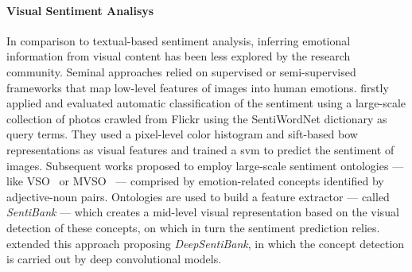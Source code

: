 \paragraph{Visual Sentiment Analisys}
In comparison to textual-based sentiment analysis, inferring emotional information from visual content has been less explored by the research community.
Seminal approaches \cite{machajdik2010affective,siersdorfer2010analyzing,jia2012can} relied on supervised or semi-supervised frameworks that map low-level features of images into human emotions.
\citet{siersdorfer2010analyzing} firstly applied and evaluated automatic classification of the sentiment using a large-scale collection of photos crawled from Flickr using the SentiWordNet \cite{esuli2007sentiwordnet} dictionary as query terms.
They used a pixel-level color histogram and \acrshort{sift}-based \acrlong{bow} representations as visual features and trained a \gls{svm} to predict the sentiment of images.
Subsequent works \cite{borth2013large,yuan2013sentribute,jou2015visual} proposed to employ large-scale sentiment ontologies --- like VSO~\cite{borth2013large} or MVSO~\cite{jou2015visual} --- comprised by emotion-related concepts identified by adjective-noun pairs.
Ontologies are used to build a feature extractor --- called \emph{SentiBank} --- which creates a mid-level visual representation based on the visual detection of these concepts, on which in turn the sentiment prediction relies.
\citet{chen2014deepsentibank} extended this approach proposing \emph{DeepSentiBank}, in which the concept detection is carried out by deep convolutional models.
